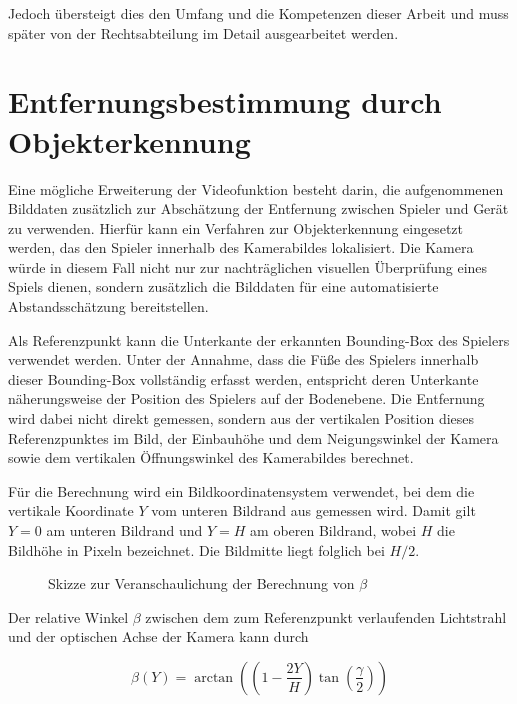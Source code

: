 Jedoch übersteigt dies den Umfang und die Kompetenzen dieser Arbeit und muss später von der Rechtsabteilung im Detail ausgearbeitet werden.

\section{Entfernungsbestimmung durch Objekterkennung} \label{sec:entfernungsbestimmung} 

Eine mögliche Erweiterung der Videofunktion besteht darin, die aufgenommenen Bilddaten zusätzlich zur Abschätzung der Entfernung zwischen Spieler und Gerät zu verwenden. Hierfür kann ein Verfahren zur Objekterkennung eingesetzt werden, das den Spieler innerhalb des Kamerabildes lokalisiert. 
Die Kamera würde in diesem Fall nicht nur zur nachträglichen visuellen Überprüfung eines Spiels dienen, sondern zusätzlich die Bilddaten für eine automatisierte Abstandsschätzung bereitstellen. 

Als Referenzpunkt kann die Unterkante der erkannten Bounding-Box des Spielers verwendet werden. Unter der Annahme, dass die Füße des Spielers innerhalb dieser Bounding-Box vollständig erfasst werden, entspricht deren Unterkante näherungsweise der Position des Spielers auf der Bodenebene. 
Die Entfernung wird dabei nicht direkt gemessen, sondern aus der vertikalen Position dieses Referenzpunktes im Bild, der Einbauhöhe und dem Neigungswinkel der Kamera sowie dem vertikalen Öffnungswinkel des Kamerabildes berechnet. 

Für die Berechnung wird ein Bildkoordinatensystem verwendet, bei dem die vertikale Koordinate \(Y\) vom unteren Bildrand aus gemessen wird. Damit gilt \(Y = 0\) am unteren Bildrand und \(Y = H\) am oberen Bildrand, wobei \(H\) die Bildhöhe in Pixeln bezeichnet. Die Bildmitte liegt folglich bei \(H/2\). 

\begin{figure}[ht]
    \centering
    
    \caption[Skizze zur Veranschaulichung der Berechnung von $\beta$]{Skizze zur Veranschaulichung der Berechnung von $\beta$}
    \label{fig:beta}
\end{figure}

Der relative Winkel \(\beta\) zwischen dem zum Referenzpunkt verlaufenden Lichtstrahl und der optischen Achse der Kamera kann durch 

\begin{equation} 
    \beta(Y) = \arctan\left( \left(1-\frac{2Y}{H}\right) \tan\left(\frac{\gamma}{2}\right) \right) 
    \label{eq:relativer_bildwinkel} 
\end{equation} 


